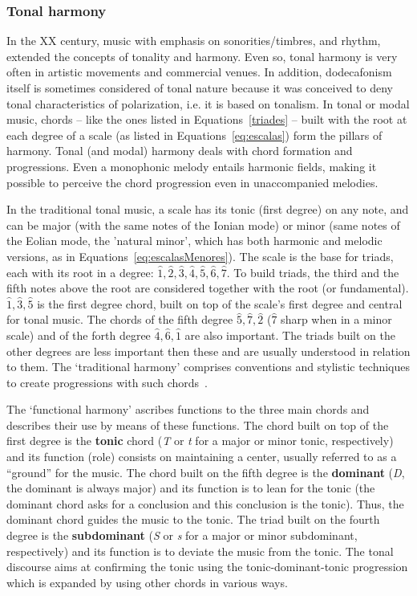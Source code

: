 \subsubsection{Tonal harmony}
In the XX century, music with emphasis on sonorities/timbres, and rhythm, extended the concepts of tonality and harmony. Even so, tonal harmony is very often in artistic movements and commercial venues. In addition, dodecafonism itself is sometimes considered of tonal nature because it was conceived to deny tonal characteristics of polarization, i.e. it is based on tonalism.
In tonal or modal music, chords -- like the ones listed in
Equations~\ref{triades} -- built with the root at each degree of a scale (as listed in Equations~\ref{eq:escalas}) form the pillars of harmony.
Tonal (and modal) harmony deals with chord formation and progressions.
Even a monophonic melody entails harmonic fields, making it possible to perceive the chord progression even in unaccompanied melodies.

In the traditional tonal music, a scale has its tonic (first
degree) on any note, and can be major (with the same notes of the Ionian mode) or minor (same notes of the Eolian mode, the 'natural minor', which has both harmonic and melodic versions, as in Equations~\ref{eq:escalasMenores}). The
scale is the base for triads, each with its root in a degree: $\hat{1},\hat{2},\hat{3},\hat{4},\hat{5},\hat{6},\hat{7}$.
To build triads, the third and the fifth notes above the root are considered together with the root (or fundamental).
$\hat{1},\hat{3},\hat{5}$ is the first degree chord,
 built on top of the scale's first degree and central for tonal music. The chords of the fifth degree $\hat{5},\hat{7},\hat{2}$ ($\hat{7}$ sharp when in a minor scale) and of the forth degree $\hat{4},\hat{6},\hat{1}$ are also important.
 The triads built on the other degrees are less important then these and are usually understood in relation to them. The `traditional harmony' comprises conventions and stylistic techniques to create progressions with such chords~\cite{Harmonia}. 

The `functional harmony' ascribes functions to the three main chords and describes their use by means of these functions. The chord built on top of the first degree is the \textbf{tonic} chord (\textit{T} or \textit{t} for a major or minor tonic, respectively) and its function (role) consists on maintaining a center, usually referred to as a ``ground'' for the music. The chord built on the fifth degree is the \textbf{dominant} (\textit{D}, the dominant is always major) and its function is to lean for the tonic
(the dominant chord asks for a conclusion and this conclusion is the tonic). Thus, the dominant chord guides the music to the tonic. The triad built on the fourth degree is the \textbf{subdominant} (\textit{S} or \textit{s} for a major or minor
subdominant, respectively) and its function is to deviate the music from the tonic.
The tonal discourse aims at confirming the tonic using the tonic-dominant-tonic progression
which is expanded by using other chords in various ways.

